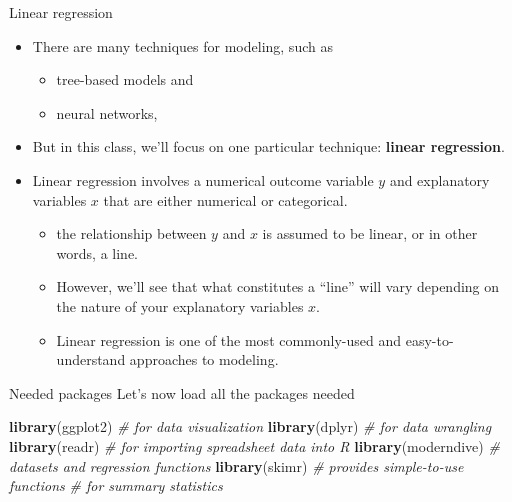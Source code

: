 \documentclass[
  ignorenonframetext,
]{beamer}
\newenvironment{Shaded}{\begin{snugshade}}{\end{snugshade}}
\newcommand{\CommentTok}[1]{\textcolor[rgb]{0.56,0.35,0.01}{\textit{#1}}}
\newcommand{\FunctionTok}[1]{\textcolor[rgb]{0.13,0.29,0.53}{\textbf{#1}}}
\newcommand{\NormalTok}[1]{#1}
\providecommand{\tightlist}{%
  \setlength{\itemsep}{0pt}\setlength{\parskip}{0pt}}
\begin{document}
\begin{frame}{Linear regression}
\protect\hypertarget{linear-regression}{}
\begin{itemize}
\item
  There are many techniques for modeling, such as

  \begin{itemize}
  \tightlist
  \item
    tree-based models and
  \item
    neural networks,
  \end{itemize}
\item
  But in this class, we'll focus on one particular technique:
  \textbf{linear regression}.
\item
  Linear regression involves a numerical outcome variable \(y\) and
  explanatory variables \(x\) that are either numerical or categorical.

  \begin{itemize}
  \tightlist
  \item
    the relationship between \(y\) and \(x\) is assumed to be linear, or
    in other words, a line.
  \item
    However, we'll see that what constitutes a ``line'' will vary
    depending on the nature of your explanatory variables \(x\).
  \item
    Linear regression is one of the most commonly-used and
    easy-to-understand approaches to modeling.
  \end{itemize}
\end{itemize}
\end{frame}

\begin{frame}[fragile]{Needed packages}
\protect\hypertarget{needed-packages}{}
Let's now load all the packages needed

\normalsize

\begin{Shaded}
\begin{Highlighting}[]
\FunctionTok{library}\NormalTok{(ggplot2)    }\CommentTok{\#  for data visualization}
\FunctionTok{library}\NormalTok{(dplyr)      }\CommentTok{\#  for data wrangling}
\FunctionTok{library}\NormalTok{(readr)      }\CommentTok{\#  for importing spreadsheet data into R}
\FunctionTok{library}\NormalTok{(moderndive) }\CommentTok{\#  datasets and regression functions}
\FunctionTok{library}\NormalTok{(skimr)      }\CommentTok{\#  provides simple{-}to{-}use functions }
                    \CommentTok{\#  for summary statistics}
\end{Highlighting}
\end{Shaded}

\normalsize
\end{frame}
\end{document}
